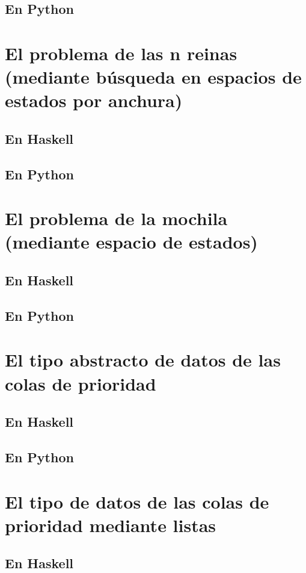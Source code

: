 \documentclass[a4paper,12pt,twoside]{book}
\begin{document}
\subsection{En Python}

\section{El problema de las n reinas (mediante búsqueda en espacios de estados por anchura)}
\subsection{En Haskell}
\subsection{En Python}

\section{El problema de la mochila (mediante espacio de estados)}
\subsection{En Haskell}
\subsection{En Python}

\section{El tipo abstracto de datos de las colas de prioridad}
\subsection{En Haskell}
\subsection{En Python}

\section{El tipo de datos de las colas de prioridad mediante listas}
\subsection{En Haskell}
\end{document}
